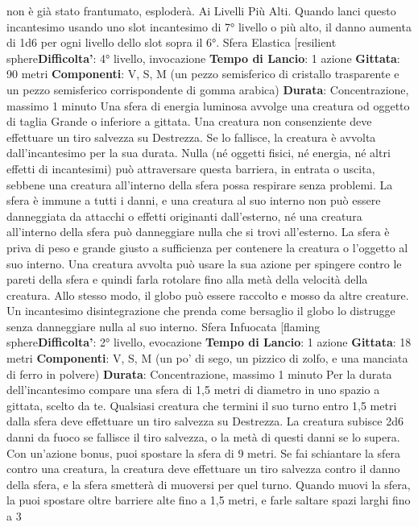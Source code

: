 \begin{multicols}{2}
non è già stato frantumato, esploderà.
Ai Livelli Più Alti. Quando lanci questo incantesimo
usando uno slot incantesimo di 7° livello o più alto, il
danno aumenta di 1d6 per ogni livello dello slot sopra il
6°.
Sfera Elastica
[resilient sphere\textbf{Difficolta'}:
4° livello, invocazione
\textbf{Tempo di Lancio}: 1 azione
\textbf{Gittata}: 90 metri
\textbf{Componenti}: V, S, M (un pezzo semisferico di cristallo
trasparente e un pezzo semisferico corrispondente di
gomma arabica)
\textbf{Durata}: Concentrazione, massimo 1 minuto
Una sfera di energia luminosa avvolge una creatura od
oggetto di taglia Grande o inferiore a gittata. Una
creatura non consenziente deve effettuare un tiro 
salvezza su Destrezza. Se lo fallisce, la creatura è
avvolta dall’incantesimo per la sua durata.
Nulla (né oggetti fisici, né energia, né altri effetti di
incantesimi) può attraversare questa barriera, in entrata
o uscita, sebbene una creatura all’interno della sfera
possa respirare senza problemi. La sfera è immune a
tutti i danni, e una creatura al suo interno non può
essere danneggiata da attacchi o effetti originanti
dall’esterno, né una creatura all’interno della sfera può
danneggiare nulla che si trovi all’esterno.
La sfera è priva di peso e grande giusto a sufficienza
per contenere la creatura o l’oggetto al suo interno. Una
creatura avvolta può usare la sua azione per spingere
contro le pareti della sfera e quindi farla rotolare fino
alla metà della velocità della creatura. Allo stesso
modo, il globo può essere raccolto e mosso da altre
creature.
Un incantesimo disintegrazione che prenda come
bersaglio il globo lo distrugge senza danneggiare nulla
al suo interno.
Sfera Infuocata
[flaming sphere\textbf{Difficolta'}:
2° livello, evocazione
\textbf{Tempo di Lancio}: 1 azione
\textbf{Gittata}: 18 metri
\textbf{Componenti}: V, S, M (un po’ di sego, un pizzico di
zolfo, e una manciata di ferro in polvere)
\textbf{Durata}: Concentrazione, massimo 1 minuto
Per la durata dell’incantesimo compare una sfera di 1,5
metri di diametro in uno spazio a gittata, scelto da te.
Qualsiasi creatura che termini il suo turno entro 1,5
metri dalla sfera deve effettuare un tiro salvezza su
Destrezza. La creatura subisce 2d6 danni da fuoco se
fallisce il tiro salvezza, o la metà di questi danni se lo
supera.
Con un’azione bonus, puoi spostare la sfera di 9 metri.
Se fai schiantare la sfera contro una creatura, la
creatura deve effettuare un tiro salvezza contro il danno
della sfera, e la sfera smetterà di muoversi per quel
turno.
Quando muovi la sfera, la puoi spostare oltre barriere
alte fino a 1,5 metri, e farle saltare spazi larghi fino a 3

\end{multicols}
